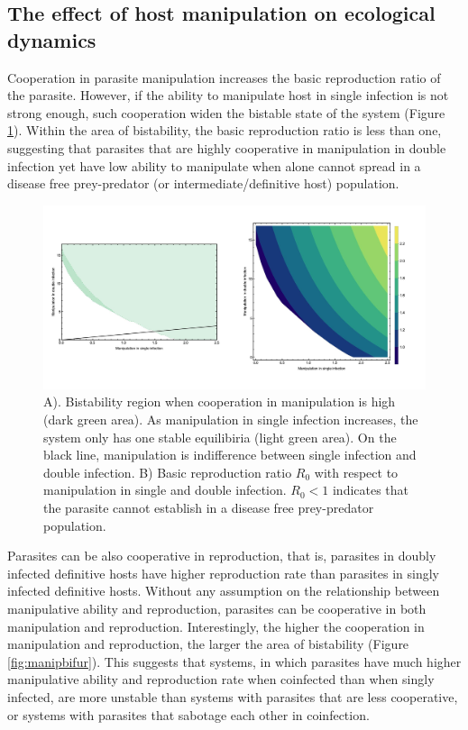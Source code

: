 \documentclass[11pt]{article}
\begin{document}
\subsection*{The effect of host manipulation on ecological dynamics}


Cooperation in parasite manipulation increases the basic reproduction ratio of the parasite. However, if the ability to manipulate host in single infection is not strong enough, such cooperation widen the bistable state of the system (Figure \ref{fig:manipR0}). Within the area of bistability, the basic reproduction ratio is less than one, suggesting that parasites that are highly cooperative in manipulation in double infection yet have low ability to manipulate when alone cannot spread in a disease free prey-predator (or intermediate/definitive host) population. 

\begin{figure}
\includegraphics[width=\textwidth]{Figures/manip_bifur_R0.jpeg}
\caption{A). Bistability region when cooperation in manipulation is high (dark green area). As manipulation in single infection increases, the system only has one stable equilibiria (light green area). On the black line, manipulation is indifference between single infection and double infection. B) Basic reproduction ratio $R_0$ with respect to manipulation in single and double infection. $R_0 < 1$ indicates that the parasite cannot establish in a disease free prey-predator population.}
\label{fig:manipR0}
\end{figure}

Parasites can be also cooperative in reproduction, that is, parasites in doubly infected definitive hosts have higher reproduction rate than parasites in singly infected definitive hosts. Without any assumption on the relationship between manipulative ability and reproduction, parasites can be cooperative in both manipulation and reproduction. Interestingly, the higher the cooperation in manipulation and reproduction, the larger the area of bistability (Figure \ref{fig:manipbifur}). This suggests that systems, in which parasites have much higher manipulative ability and reproduction rate when coinfected than when singly infected, are more unstable than systems with parasites that are less cooperative, or systems with parasites that sabotage each other in coinfection. \cite{akbari:ACSSynBio:2014}
\end{document}

